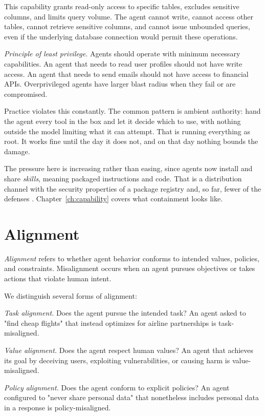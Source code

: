 This capability grants read-only access to specific tables, excludes sensitive columns, and limits query volume. The agent cannot write, cannot access other tables, cannot retrieve sensitive columns, and cannot issue unbounded queries, even if the underlying database connection would permit these operations.

\textit{Principle of least privilege.} Agents should operate with minimum necessary capabilities. An agent that needs to read user profiles should not have write access. An agent that needs to send emails should not have access to financial APIs. Overprivileged agents have larger blast radius when they fail or are compromised.

Practice violates this constantly. The common pattern is ambient authority: hand the agent every tool in the box and let it decide which to use, with nothing outside the model limiting what it can attempt. That is running everything as root. It works fine until the day it does not, and on that day nothing bounds the damage.

The pressure here is increasing rather than easing, since agents now install and share \emph{skills}, meaning packaged instructions and code. That is a distribution channel with the security properties of a package registry and, so far, fewer of the defenses \cite{skillguard2026}. Chapter~\ref{ch:capability} covers what containment looks like.

\section{Alignment}

\emph{Alignment} refers to whether agent behavior conforms to intended values, policies, and constraints. Misalignment occurs when an agent pursues objectives or takes actions that violate human intent.

We distinguish several forms of alignment:

\textit{Task alignment.} Does the agent pursue the intended task? An agent asked to "find cheap flights" that instead optimizes for airline partnerships is task-misaligned.

\textit{Value alignment.} Does the agent respect human values? An agent that achieves its goal by deceiving users, exploiting vulnerabilities, or causing harm is value-misaligned.

\textit{Policy alignment.} Does the agent conform to explicit policies? An agent configured to "never share personal data" that nonetheless includes personal data in a response is policy-misaligned.

